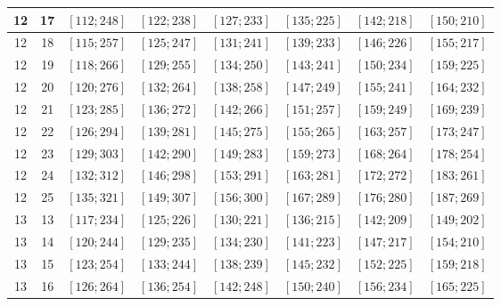 \documentclass[a4paper,12pt]{article}
\begin{document}
\begin{center}
{\begin{longtable}[H]{|c|c|c|c|c|c|c|c|}
12 &  17 &  $\left[ 112; 248\right]$ &  $\left[ 122; 238\right]$ &  $\left[ 127; 233\right]$ &  $\left[ 135; 225\right]$ &  $\left[ 142; 218\right]$ &  $\left[ 150; 210\right]$ \tabularnewline \hline
12 &  18 &  $\left[ 115; 257\right]$ &  $\left[ 125; 247\right]$ &  $\left[ 131; 241\right]$ &  $\left[ 139; 233\right]$ &  $\left[ 146; 226\right]$ &  $\left[ 155; 217\right]$ \tabularnewline \hline
12 &  19 &  $\left[ 118; 266\right]$ &  $\left[ 129; 255\right]$ &  $\left[ 134; 250\right]$ &  $\left[ 143; 241\right]$ &  $\left[ 150; 234\right]$ &  $\left[ 159; 225\right]$ \tabularnewline \hline
12 &  20 &  $\left[ 120; 276\right]$ &  $\left[ 132; 264\right]$ &  $\left[ 138; 258\right]$ &  $\left[ 147; 249\right]$ &  $\left[ 155; 241\right]$ &  $\left[ 164; 232\right]$ \tabularnewline \hline
12 &  21 &  $\left[ 123; 285\right]$ &  $\left[ 136; 272\right]$ &  $\left[ 142; 266\right]$ &  $\left[ 151; 257\right]$ &  $\left[ 159; 249\right]$ &  $\left[ 169; 239\right]$ \tabularnewline \hline
12 &  22 &  $\left[ 126; 294\right]$ &  $\left[ 139; 281\right]$ &  $\left[ 145; 275\right]$ &  $\left[ 155; 265\right]$ &  $\left[ 163; 257\right]$ &  $\left[ 173; 247\right]$ \tabularnewline \hline
12 &  23 &  $\left[ 129; 303\right]$ &  $\left[ 142; 290\right]$ &  $\left[ 149; 283\right]$ &  $\left[ 159; 273\right]$ &  $\left[ 168; 264\right]$ &  $\left[ 178; 254\right]$ \tabularnewline \hline
12 &  24 &  $\left[ 132; 312\right]$ &  $\left[ 146; 298\right]$ &  $\left[ 153; 291\right]$ &  $\left[ 163; 281\right]$ &  $\left[ 172; 272\right]$ &  $\left[ 183; 261\right]$ \tabularnewline \hline
12 &  25 &  $\left[ 135; 321\right]$ &  $\left[ 149; 307\right]$ &  $\left[ 156; 300\right]$ &  $\left[ 167; 289\right]$ &  $\left[ 176; 280\right]$ &  $\left[ 187; 269\right]$ \tabularnewline \hline
13 &  13 &  $\left[ 117; 234\right]$ &  $\left[ 125; 226\right]$ &  $\left[ 130; 221\right]$ &  $\left[ 136; 215\right]$ &  $\left[ 142; 209\right]$ &  $\left[ 149; 202\right]$ \tabularnewline \hline
13 &  14 &  $\left[ 120; 244\right]$ &  $\left[ 129; 235\right]$ &  $\left[ 134; 230\right]$ &  $\left[ 141; 223\right]$ &  $\left[ 147; 217\right]$ &  $\left[ 154; 210\right]$ \tabularnewline \hline
13 &  15 &  $\left[ 123; 254\right]$ &  $\left[ 133; 244\right]$ &  $\left[ 138; 239\right]$ &  $\left[ 145; 232\right]$ &  $\left[ 152; 225\right]$ &  $\left[ 159; 218\right]$ \tabularnewline \hline
13 &  16 &  $\left[ 126; 264\right]$ &  $\left[ 136; 254\right]$ &  $\left[ 142; 248\right]$ &  $\left[ 150; 240\right]$ &  $\left[ 156; 234\right]$ &  $\left[ 165; 225\right]$ \tabularnewline \hline

\end{longtable}}
\end{center}
\end{document}
